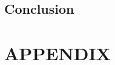 \documentclass[10pt, a4paper, twocolumn]{article} %
\begin{document}
\subsection{Conclusion}




\printbibliography[title={Bibliography}] %



\onecolumn\section*{APPENDIX}
\end{document}
